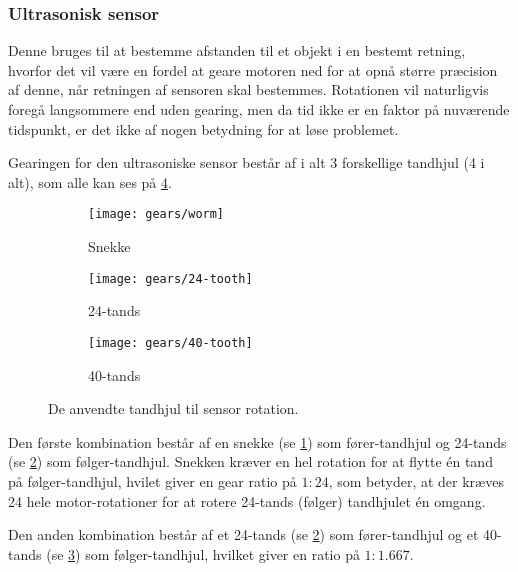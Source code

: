 \subsubsection{Ultrasonisk sensor}
Denne bruges til at bestemme afstanden til et objekt i en bestemt retning, hvorfor det vil være en fordel at geare motoren ned for at opnå større præcision af denne, når retningen af sensoren skal bestemmes.
Rotationen vil naturligvis foregå langsommere end uden gearing, men da tid ikke er en faktor på nuværende tidspunkt, er det ikke af nogen betydning for at løse problemet.

Gearingen for den ultrasoniske sensor består af i alt 3 forskellige tandhjul (4 i alt), som alle kan ses på \cref{gearing:tandhjul}.

\begin{figure}[h] %
\centering
\begin{subfigure}[b]{.19\textwidth}
\centering
\texttt{[image: gears/worm]}
\caption{Snekke}
\label{gearing:snekke}
\end{subfigure}
\begin{subfigure}[b]{.19\textwidth}
\centering
\texttt{[image: gears/24-tooth]}
\caption{24-tands}
\label{gearing:24tand}
\end{subfigure}
\begin{subfigure}[b]{.19\textwidth}
\centering
\texttt{[image: gears/40-tooth]}
\caption{40-tands}
\label{gearing:40tand}
\end{subfigure}
\caption{De anvendte tandhjul til sensor rotation.}
\label{gearing:tandhjul}
\end{figure}

Den første kombination består af en snekke\cite{snekke} (se \cref{gearing:snekke}) som fører-tandhjul og 24-tands (se \cref{gearing:24tand}) som følger-tandhjul.
Snekken kræver en hel rotation for at flytte én tand på følger-tandhjul, hvilet giver en gear ratio på $1:24$, som betyder, at der kræves 24 hele motor-rotationer for at rotere 24-tands (følger) tandhjulet én omgang.

Den anden kombination består af et 24-tands (se \cref{gearing:24tand}) som fører-tandhjul og et 40-tands (se \cref{gearing:40tand}) som følger-tandhjul, hvilket giver en ratio på $1:1.667$.

